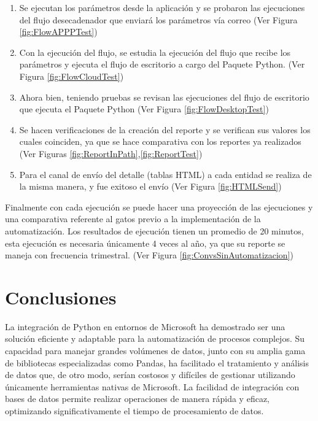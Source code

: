 \documentclass[letter,oneside,12pt,spanish]{report}
\begin{document}
\begin{enumerate}
    \item Se ejecutan los parámetros desde la aplicación y se probaron las ejecuciones del flujo desecadenador que enviará los parámetros vía correo (Ver Figura \ref{fig:FlowAPPPTest})

    \item Con la ejecución del flujo, se estudia la ejecución del flujo que recibe los parámetros y ejecuta el flujo de escritorio a cargo del Paquete Python. (Ver Figura \ref{fig:FlowCloudTest})

   

    \item Ahora bien, teniendo pruebas se revisan las ejecuciones del flujo de escritorio que ejecuta el Paquete Python (Ver Figura \ref{fig:FlowDesktopTest})

    \item Se hacen verificaciones de la creación del reporte y se verifican sus valores los cuales coinciden, ya que se hace comparativa con los reportes ya realizados (Ver Figuras \ref{fig:ReportInPath},\ref{fig:ReportTest})

         
    \item Para el canal de envío del detalle (tablas HTML) a cada entidad se realiza de la misma manera, y fue exitoso el envío (Ver Figura \ref{fig:HTMLSend})
\end{enumerate}


\noindent Finalmente con cada ejecución se puede hacer una proyección de las ejecuciones y una comparativa referente al gatos previo a la implementación de la automatización. Los resultados de ejecución tienen un promedio de 20 minutos, esta ejecución es necesaria únicamente 4 veces al año, ya que su reporte se maneja con frecuencia trimestral. (Ver Figura \ref{fig:ConvsSinAutomatizacion})





\newpage
\chapter{Conclusiones}


\noindent La integración de Python en entornos de Microsoft ha demostrado ser una solución eficiente y adaptable para la automatización de procesos complejos. Su capacidad para manejar grandes volúmenes de datos, junto con su amplia gama de bibliotecas especializadas como Pandas, ha facilitado el tratamiento y análisis de datos que, de otro modo, serían costosos y difíciles de gestionar utilizando únicamente herramientas nativas de Microsoft. La facilidad de integración con bases de datos permite realizar operaciones de manera rápida y eficaz, optimizando significativamente el tiempo de procesamiento de datos.
\end{document}
